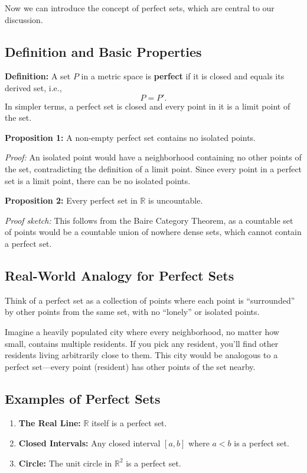 \documentclass{article}
\begin{document}
Now we can introduce the concept of perfect sets, which are central to our discussion.

\subsection{Definition and Basic Properties}

\textbf{Definition:} A set $P$ in a metric space is \textbf{perfect} if it is closed and equals its derived set, i.e., 
\[
P = P'.
\]
In simpler terms, a perfect set is closed and every point in it is a limit point of the set.

\textbf{Proposition 1:} A non-empty perfect set contains no isolated points.

\textit{Proof:} An isolated point would have a neighborhood containing no other points of the set, contradicting the definition of a limit point. Since every point in a perfect set is a limit point, there can be no isolated points.

\textbf{Proposition 2:} Every perfect set in $\mathbb{R}$ is uncountable.

\textit{Proof sketch:} This follows from the Baire Category Theorem, as a countable set of points would be a countable union of nowhere dense sets, which cannot contain a perfect set.

\subsection{Real-World Analogy for Perfect Sets}

Think of a perfect set as a collection of points where each point is ``surrounded'' by other points from the same set, with no ``lonely'' or isolated points. 

Imagine a heavily populated city where every neighborhood, no matter how small, contains multiple residents. If you pick any resident, you'll find other residents living arbitrarily close to them. This city would be analogous to a perfect set---every point (resident) has other points of the set nearby.

\subsection{Examples of Perfect Sets}

\begin{enumerate}
    \item \textbf{The Real Line:} $\mathbb{R}$ itself is a perfect set.
    \item \textbf{Closed Intervals:} Any closed interval $[a,b]$ where $a < b$ is a perfect set.
    \item \textbf{Circle:} The unit circle in $\mathbb{R}^2$ is a perfect set.
\end{enumerate}
\end{document}
